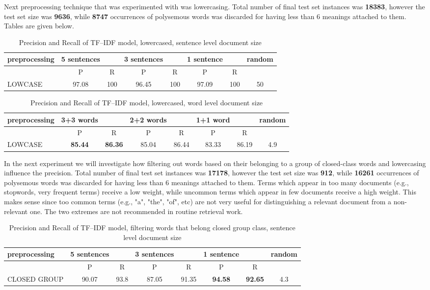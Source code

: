 Next preprocessing technique that was experimented with was lowercasing. Total number of final test set instances was \textbf{18383}, however the test set size was \textbf{9636}, while \textbf{8747} occurrences of polysemous words was discarded  for having less than 6 meanings attached to them. Tables are given below.
\begin{table}[h!]
\begin{tabular}{ l | c c | c c | c c | c}
   preprocessing &  5 sentences && 3 sentences && 1 sentence  && random\\
\hline
	& P  &  R & P  &  R & P  &  R &\\
\hline\hline
LOWCASE  & 97.08 & 100 & 96.45 & 100 & 97.09 & 100 & 50 \\
\end{tabular}
\caption{Precision and Recall of TF--IDF model, lowercased, sentence level document size}
\end{table}

\begin{table}[h!]
\begin{tabular}{ l | c c | c c | c c | c}
   preprocessing &  3+3 words && 2+2 words && 1+1 word  && random\\
\hline\hline
	& P  &  R & P  &  R & P  &  R &\\
\hline
LOWCASE  & \textbf{85.44}  &  \textbf{86.36} &  85.04 & 86.44 & 83.33  & 86.19  & 4.9 \\
\end{tabular}
\caption{Precision and Recall of TF--IDF model, lowercased, word level document size}
\end{table}

In the next experiment we 
will investigate how filtering out words based on their belonging to a group of closed-class words and 
lowercasing influence the precision. Total number of final test set instances was  \textbf{17178}, however the test set size was  \textbf{912}, while \textbf{16261} occurrences of polysemous words was discarded  for having less than 6 meanings attached to them. 
Terms which appear in too many documents (e.g., stopwords, very 
frequent terms) receive a low weight, while uncommon terms which appear in few documents receive a 
high weight. This makes sense since too common terms (e.g., "a", "the", "of", etc) are not very useful for 
distinguishing a relevant document from a non-relevant one. The two extremes are not recommended in routine retrieval work. 

\begin{table}[h!]
\begin{tabular}{ l | c c | c c | c c | c}
   preprocessing &  5 sentences && 3 sentences && 1 sentence  && random\\
\hline
	& P  &  R & P  &  R & P  &  R &\\
\hline\hline
CLOSED GROUP & 90.07 & 93.8  & 87.05  & 91.35  & \textbf{94.58}  & \textbf{92.65}  & 4.3  \\
\end{tabular}
\caption{Precision and Recall of TF--IDF model, filtering words that belong closed group class, sentence level document size}
\end{table}

